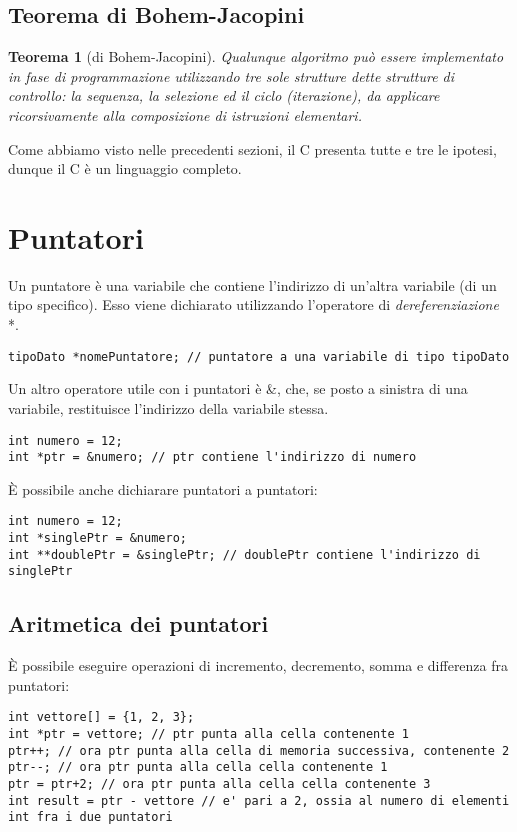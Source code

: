 \subsection{Teorema di Bohem-Jacopini}
\newtheorem*{theorem}{Teorema}
\begin{theorem}[di Bohem-Jacopini]
	Qualunque algoritmo può essere implementato in fase di programmazione utilizzando tre sole strutture dette strutture di controllo: la \textit{sequenza}, la \textit{selezione} ed il \textit{ciclo} (iterazione), da applicare ricorsivamente alla composizione di istruzioni elementari.
\end{theorem}
Come abbiamo visto nelle precedenti sezioni, il C presenta tutte e tre le ipotesi, dunque il C è un linguaggio completo.

\section{Puntatori}\label{puntatori}
Un puntatore è una variabile che contiene l’indirizzo di un’altra variabile (di un tipo specifico). Esso viene dichiarato utilizzando l’operatore di \textit{dereferenziazione} \colorbox{light-gray}{*}. 
\begin{lstlisting}[title = {Dichiarazione generica di una variabile puntatore}]
tipoDato *nomePuntatore; // puntatore a una variabile di tipo tipoDato
\end{lstlisting}

Un altro operatore utile con i puntatori è \colorbox{light-gray}{\&}, che, se posto a sinistra di una variabile, restituisce l’indirizzo della variabile stessa.
\begin{lstlisting}[title = {Utilizzo dell'operatore \&}]
int numero = 12;
int *ptr = &numero; // ptr contiene l'indirizzo di numero
\end{lstlisting}

\`{E} possibile anche dichiarare puntatori a puntatori:
\begin{lstlisting}[title = {Puntatori di puntatori}]
int numero = 12;
int *singlePtr = &numero; 
int **doublePtr = &singlePtr; // doublePtr contiene l'indirizzo di singlePtr
\end{lstlisting}

\subsection{Aritmetica dei puntatori}
\`{E} possibile eseguire operazioni di incremento, decremento, somma e differenza fra puntatori:
\begin{lstlisting}[title = {Esempi sull'aritmetica dei puntatori}]
int vettore[] = {1, 2, 3};
int *ptr = vettore; // ptr punta alla cella contenente 1
ptr++; // ora ptr punta alla cella di memoria successiva, contenente 2
ptr--; // ora ptr punta alla cella cella contenente 1
ptr = ptr+2; // ora ptr punta alla cella cella contenente 3
int result = ptr - vettore // e' pari a 2, ossia al numero di elementi int fra i due puntatori

\end{lstlisting}

